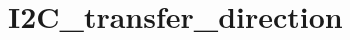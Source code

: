 \hypertarget{group___i2_c__transfer__direction}{\section{I2\-C\-\_\-transfer\-\_\-direction}
\label{group___i2_c__transfer__direction}
}
